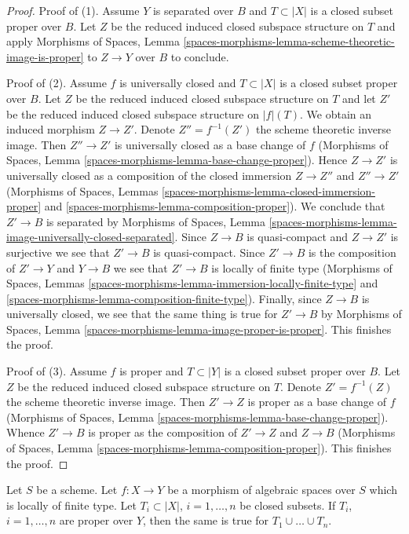 \begin{proof}
Proof of (1). Assume $Y$ is separated over $B$ and $T \subset |X|$
is a closed subset proper over $B$. Let $Z$ be the reduced induced
closed subspace structure on $T$ and apply
Morphisms of Spaces, Lemma
\ref{spaces-morphisms-lemma-scheme-theoretic-image-is-proper}
to $Z \to Y$ over $B$ to conclude.

\medskip\noindent
Proof of (2). Assume $f$ is universally closed and $T \subset |X|$ is a
closed subset proper over $B$. Let $Z$ be the reduced induced
closed subspace structure on $T$ and let $Z'$ be the reduced
induced closed subspace structure on $|f|(T)$. We obtain an induced
morphism $Z \to Z'$.
Denote $Z'' = f^{-1}(Z')$ the scheme theoretic inverse image.
Then $Z'' \to Z'$ is universally closed as a base change of $f$
(Morphisms of Spaces, Lemma \ref{spaces-morphisms-lemma-base-change-proper}).
Hence $Z \to Z'$ is universally closed as a composition of
the closed immersion $Z \to Z''$ and $Z'' \to Z'$
(Morphisms of Spaces, Lemmas
\ref{spaces-morphisms-lemma-closed-immersion-proper} and
\ref{spaces-morphisms-lemma-composition-proper}).
We conclude that $Z' \to B$ is separated by
Morphisms of Spaces, Lemma
\ref{spaces-morphisms-lemma-image-universally-closed-separated}.
Since $Z \to B$ is quasi-compact and $Z \to Z'$ is surjective
we see that $Z' \to B$ is quasi-compact.
Since $Z' \to B$ is the composition of $Z' \to Y$ and $Y \to B$
we see that $Z' \to B$ is locally of finite type
(Morphisms of Spaces, Lemmas
\ref{spaces-morphisms-lemma-immersion-locally-finite-type} and
\ref{spaces-morphisms-lemma-composition-finite-type}).
Finally, since $Z \to B$ is universally closed, we see that
the same thing is true for $Z' \to B$ by
Morphisms of Spaces, Lemma
\ref{spaces-morphisms-lemma-image-proper-is-proper}.
This finishes the proof.

\medskip\noindent
Proof of (3). Assume $f$ is proper and $T \subset |Y|$ is a closed subset
proper over $B$. Let $Z$ be the reduced induced closed subspace
structure on $T$. Denote $Z' = f^{-1}(Z)$ the scheme theoretic inverse image.
Then $Z' \to Z$ is proper as a base change of $f$
(Morphisms of Spaces, Lemma \ref{spaces-morphisms-lemma-base-change-proper}).
Whence $Z' \to B$ is proper as the composition of $Z' \to Z$
and $Z \to B$
(Morphisms of Spaces, Lemma \ref{spaces-morphisms-lemma-composition-proper}).
This finishes the proof.
\end{proof}

\begin{lemma}
\label{lemma-union-closed-proper-over-base}
Let $S$ be a scheme.
Let $f : X \to Y$ be a morphism of algebraic spaces over $S$
which is locally of finite type.
Let $T_i \subset |X|$, $i = 1, \ldots, n$ be closed subsets.
If $T_i$, $i = 1, \ldots, n$ are proper over $Y$, then the same is
true for $T_1 \cup \ldots \cup T_n$.
\end{lemma}

